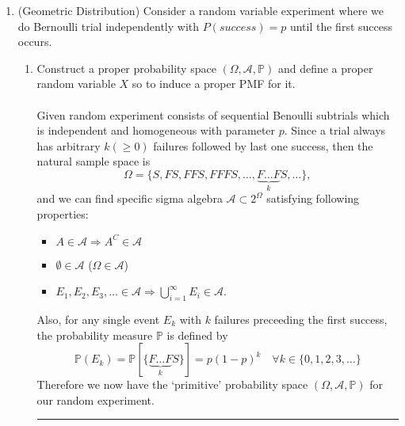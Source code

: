 \documentclass[twoside]{article}
\theoremstyle{definition}
\theoremstyle{remark}
\newenvironment{sol}{{\bf Solution:}}{\hfill\rule{2mm}{2mm}}
\begin{document}
\begin{enumerate}
  \clearpage
  \item (Geometric Distribution) Consider a random variable experiment where we
  do Bernoulli trial independently with $P(success) = p$ until the first success
  occurs.
  \begin{enumerate}
    \item Construct a proper probability space $(\Omega, \mathcal{A}, \mathbb{P})$
    and define a proper random variable $X$ so to induce a proper PMF for it. \\
    \begin{sol}\\
      Given random experiment consists of sequential Benoulli subtrials which is
      independent and homogeneous with parameter $p$. Since a trial always has
      arbitrary $k (\geq 0)$ failures followed by last one success, then the
      natural sample space is
      \begin{equation}
        \Omega = {\{ S, FS, FFS, FFFS, \ldots, \underbrace{F \ldots F}_k S, \ldots \}},
      \end{equation}
      and we can find specific sigma
      algebra $\mathcal{A} \subset 2^{\Omega}$ satisfying following properties:
      \begin{itemize}
        \item $A \in \mathcal{A} \Rightarrow A^C \in \mathcal{A}$
        \item $\emptyset \in \mathcal{A}$ ($\Omega \in \mathcal{A}$)
        \item $E_1, E_2, E_3, \ldots \in \mathcal{A} \Rightarrow \bigcup_{i=1}^{\infty} E_i \in \mathcal{A}$.
      \end{itemize}
      Also, for any single event $E_k$ with $k$ failures preceeding the first success,
      the probability measure $\mathbb{P}$ is defined by
      \begin{equation}
        \mathbb{P}(E_k) = \mathbb{P}[\{ \underbrace{F \ldots F}_k S \}]
        = p (1-p)^k \quad \forall k \in {\{0, 1, 2, 3, \ldots \}}
      \end{equation}
      Therefore we now have the `primitive' probability space $(\Omega, \mathcal{A},
      \mathbb{P})$ for our random experiment.
      \\[0.5\baselineskip]


\end{sol}
\end{enumerate}
\end{enumerate}
\end{document}
